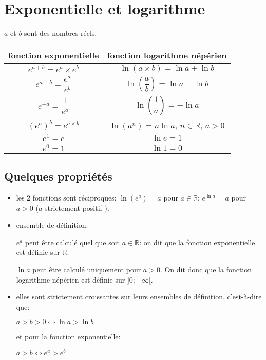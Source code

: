 \section*{Exponentielle et logarithme}

$a$ et $b$ sont des nombres réels.

\begin{center}

\begin{tabular}{|c|c|}
\hline 
\textbf{fonction exponentielle} & \textbf{fonction logarithme népérien} \\ 
\hline 
$e^{a+b} = e^{a} \times e^{b}$ & $\ln(a \times b) = \ln a + \ln b$ \\ 
\hline 
$e^{a-b} = \dfrac{e^{a}}{e^{b}}$ & $\ln \left( \dfrac{a}{b} \right) = \ln a - \ln b$ \\ 
\hline 
$e^{-a} = \dfrac{1}{e^{a}}$ & $\ln \left( \dfrac{1}{a} \right) = - \ln a$ \\ 
\hline 
$(e^{a})^{b} = e^{a \times b}$ & $\ln(a^n) = n \ln a$, $n \in \mathbb{R}$, $a > 0$ \\ 
\hline 
$e^{1} = e$ & $\ln e = 1$ \\ 
\hline 
$e^{0} = 1$ & $\ln 1 = 0$ \\ 
\hline 
\end{tabular} 

\end{center}

\subsection*{Quelques propriétés}

\begin{itemize}

\item les 2 fonctions sont réciproques: $\ln \left( e^{a} \right) = a$ pour $a \in \mathbb{R}$; $e^{\ln a} = a$ pour $a > 0$ (\og $a$ strictement positif \fg{}).

\item ensemble de définition: 

$e^{a}$ peut être calculé quel que soit $a \in \mathbb{R}$: on dit que la fonction exponentielle est définie sur $\mathbb{R}$.

$\ln a$ peut être calculé uniquement pour $a > 0$. On dit donc que la fonction logarithme népérien est définie sur $]0;+\infty[$.


\item elles sont strictement croissantes sur leurs ensembles de définition, c'est-à-dire que:

$a > b > 0 \Leftrightarrow \ln a > \ln b$

et pour la fonction exponentielle:

$a > b \Leftrightarrow e^{a} > e^{b}$

\end{itemize}
